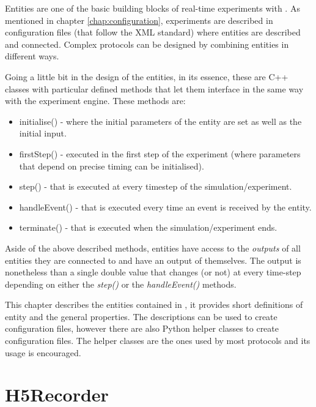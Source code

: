 
Entities are one of the basic building blocks of real-time experiments with \progname. As mentioned in chapter \ref{chap:configuration}, experiments are described in configuration files (that follow the XML standard) where entities are described and connected. Complex protocols can be designed by combining entities in different ways. 

Going a little bit in the design of the entities, in its essence, these are C++ classes with particular defined methods that let them interface in the same way with the experiment engine. These methods are:
\begin{itemize}
	\item{initialise()} - where the initial parameters of the entity are set as well as the initial input.
	\item{firstStep()} - executed in the first step of the experiment (where parameters that depend on precise timing can be initialised).
	\item{step()} - that is executed at every timestep of the simulation/experiment.
	\item{handleEvent()} - that is executed every time an event is received by the entity.
	\item{terminate()} - that is executed when the simulation/experiment ends. 
\end{itemize}
Aside of the above described methods, entities have access to the \emph{outputs} of  all entities they are connected to and have an output of themselves. The output is nonetheless than a single double value that changes (or not) at every time-step depending on either the \emph{step()} or the \emph{handleEvent()} methods. 

This chapter describes the entities contained in \progname, it provides short definitions of entity and the general properties. The descriptions can be used to create configuration files, however there are also Python helper classes to create configuration files. The helper classes are the ones used by most protocols and its usage is encouraged.

\section{H5Recorder}

